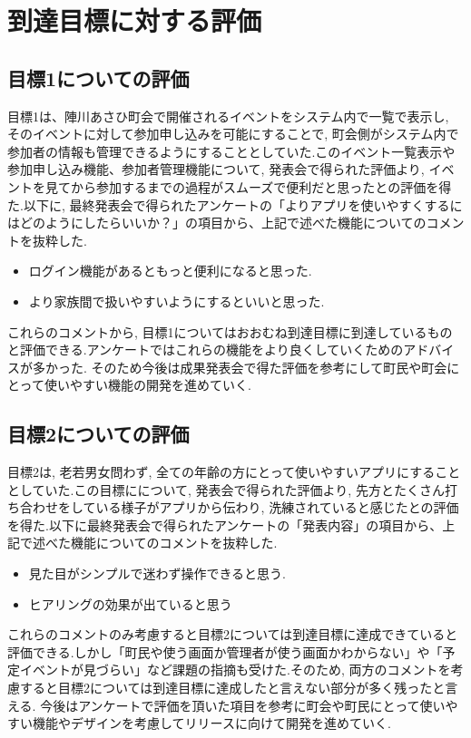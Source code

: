 \chapter{到達目標に対する評価}

\section{目標1についての評価}
目標1は、陣川あさひ町会で開催されるイベントをシステム内で一覧で表示し, そのイベントに対して参加申し込みを可能にすることで, 町会側がシステム内で参加者の情報も管理できるようにすることとしていた.このイベント一覧表示や参加申し込み機能、参加者管理機能について, 発表会で得られた評価より, イベントを見てから参加するまでの過程がスムーズで便利だと思ったとの評価を得た.以下に, 最終発表会で得られたアンケートの「よりアプリを使いやすくするにはどのようにしたらいいか？」の項目から、上記で述べた機能についてのコメントを抜粋した.

\begin{itemize}
    \item ログイン機能があるともっと便利になると思った.
    \item より家族間で扱いやすいようにするといいと思った.
\end{itemize}

これらのコメントから, 目標1についてはおおむね到達目標に到達しているものと評価できる.アンケートではこれらの機能をより良くしていくためのアドバイスが多かった. そのため今後は成果発表会で得た評価を参考にして町民や町会にとって使いやすい機能の開発を進めていく.
\section{目標2についての評価}
目標2は, 老若男女問わず, 全ての年齢の方にとって使いやすいアプリにすることとしていた.この目標にについて, 発表会で得られた評価より, 先方とたくさん打ち合わせをしている様子がアプリから伝わり, 洗練されていると感じたとの評価を得た.以下に最終発表会で得られたアンケートの「発表内容」の項目から、上記で述べた機能についてのコメントを抜粋した.

\begin{itemize}
    \item 見た目がシンプルで迷わず操作できると思う.
    \item ヒアリングの効果が出ていると思う
\end{itemize}

これらのコメントのみ考慮すると目標2については到達目標に達成できていると評価できる.しかし「町民や使う画面か管理者が使う画面かわからない」や「予定イベントが見づらい」など課題の指摘も受けた.そのため, 両方のコメントを考慮すると目標2については到達目標に達成したと言えない部分が多く残ったと言える.
今後はアンケートで評価を頂いた項目を参考に町会や町民にとって使いやすい機能やデザインを考慮してリリースに向けて開発を進めていく.
